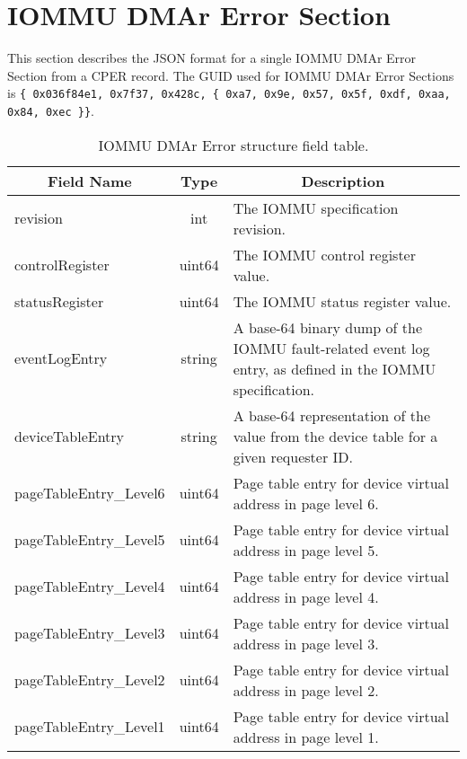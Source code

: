 \documentclass{report}
\newcommand*{\thead}[1]{\multicolumn{1}{|c|}{\bfseries #1}}
\newcommand*{\jsontable}[1]{
    \begin{table}[!ht]
    \label{#1}
    \centering
    \begin{adjustbox}{center}
    \begin{tabular}{|l|c|p{8cm}|}
    \hline
    \thead{Field Name} & \thead{Type} & \thead{Description} \\
    \hline
}
\newcommand*{\jsontableend}[1]{
    \hline
    \end{tabular}
    \end{adjustbox}
    \caption{#1}
    \label{table:#1}
    \end{table}
    \FloatBarrier
}
\begin{document}
\section{IOMMU DMAr Error Section}
\label{section:iommudmarerrorsection}
This section describes the JSON format for a single IOMMU DMAr Error Section from a CPER record. The GUID used for IOMMU DMAr Error Sections is \texttt{\{ 0x036f84e1, 0x7f37, 0x428c, \{ 0xa7, 0x9e, 0x57, 0x5f, 0xdf, 0xaa, 0x84, 0xec \}\}}.
\jsontable{table:iommudmarerrorsection}
revision & int & The IOMMU specification revision.\\
\hline
controlRegister & uint64 & The IOMMU control register value.\\
\hline
statusRegister & uint64 & The IOMMU status register value.\\
\hline
eventLogEntry & string & A base-64 binary dump of the IOMMU fault-related event log entry, as defined in the IOMMU specification.\\
\hline
deviceTableEntry & string & A base-64 representation of the value from the device table for a given requester ID.\\
\hline
pageTableEntry\_Level6 & uint64 & Page table entry for device virtual address in page level 6.\\
\hline
pageTableEntry\_Level5 & uint64 & Page table entry for device virtual address in page level 5.\\
\hline
pageTableEntry\_Level4 & uint64 & Page table entry for device virtual address in page level 4.\\
\hline
pageTableEntry\_Level3 & uint64 & Page table entry for device virtual address in page level 3.\\
\hline
pageTableEntry\_Level2 & uint64 & Page table entry for device virtual address in page level 2.\\
\hline
pageTableEntry\_Level1 & uint64 & Page table entry for device virtual address in page level 1.\\
\jsontableend{IOMMU DMAr Error structure field table.}

\end{document}
